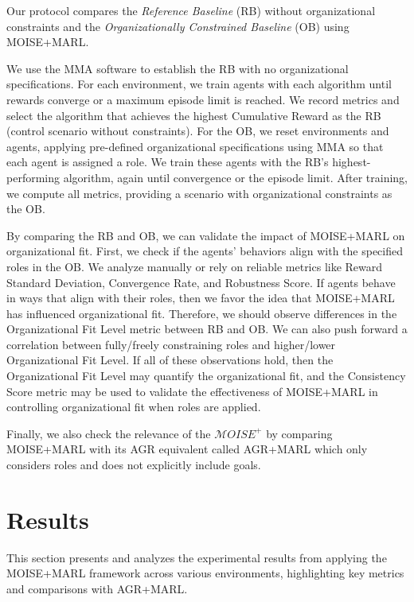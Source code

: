 \documentclass[conference]{IEEEtran}
\begin{document}
\noindent Our protocol compares the \textit{Reference Baseline} (RB) without organizational constraints and the \textit{Organizationally Constrained Baseline} (OB) using MOISE+MARL.

We use the MMA software to establish the RB with no organizational specifications. For each environment, we train agents with each algorithm until rewards converge or a maximum episode limit is reached. We record metrics and select the algorithm that achieves the highest Cumulative Reward as the RB (control scenario without constraints).
%
For the OB, we reset environments and agents, applying pre-defined organizational specifications using MMA so that each agent is assigned a role. We train these agents with the RB's highest-performing algorithm, again until convergence or the episode limit. After training, we compute all metrics, providing a scenario with organizational constraints as the OB.

By comparing the RB and OB, we can validate the impact of MOISE+MARL on organizational fit. First, we check if the agents' behaviors align with the specified roles in the OB. We analyze manually or rely on reliable metrics like Reward Standard Deviation, Convergence Rate, and Robustness Score. If agents behave in ways that align with their roles, then we favor the idea that MOISE+MARL has influenced organizational fit.
%
Therefore, we should observe differences in the Organizational Fit Level metric between RB and OB. We can also push forward a correlation between fully/freely constraining roles and higher/lower Organizational Fit Level. If all of these observations hold, then the Organizational Fit Level may quantify the organizational fit, and the Consistency Score metric may be used to validate the effectiveness of MOISE+MARL in controlling organizational fit when roles are applied.

Finally, we also check the relevance of the $\mathcal{M}OISE^+$ by comparing MOISE+MARL with its AGR equivalent called AGR+MARL which only considers roles and  does not explicitly include goals.

\section{Results}
\label{sec:results}

This section presents and analyzes the experimental results from applying the MOISE+MARL framework across various environments, highlighting key metrics and comparisons with AGR+MARL.
\end{document}
